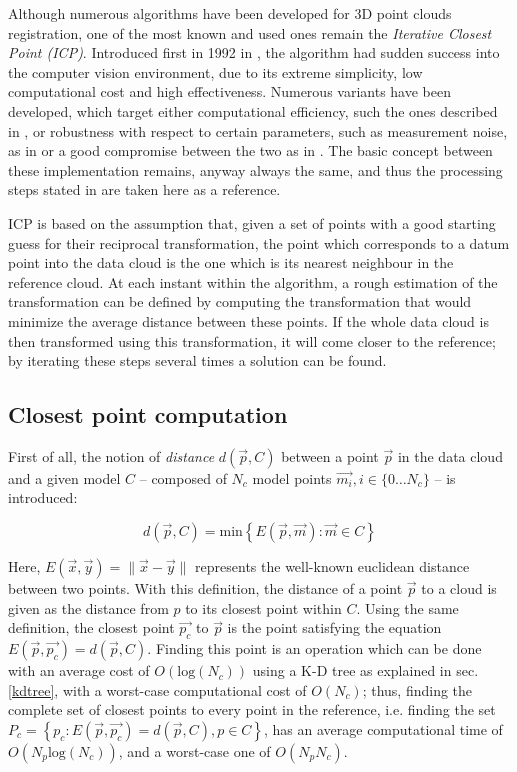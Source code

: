 Although numerous algorithms have been developed for 3D point clouds
registration, one of the most known and used ones remain the
\emph{Iterative Closest Point (\emph{ICP})}. Introduced first in 1992 in
\cite{icp}, the algorithm had sudden success into the computer vision
environment, due to its extreme simplicity, low computational cost and high
effectiveness. Numerous variants have been developed, which target either
computational efficiency, such the ones described in
\cite{icp-fast-algorithms}, or robustness with respect to certain parameters,
such as measurement noise, as in \cite{icp-bayes} or a good compromise between the
two as in \cite{icp-robust}. The basic concept between these implementation
remains, anyway always the same, and thus the processing steps stated in
\cite{icp} are taken here as a reference.

ICP is based on the assumption that, given a set of points with a good starting
guess for their reciprocal transformation, the point which corresponds to a
datum point into the data cloud is the one which is its
nearest neighbour in the reference cloud. At each instant within the
algorithm, a rough estimation of the transformation can be defined by computing
the transformation that would minimize the average distance between these
points. If the whole data cloud is then transformed using this transformation,
it will come closer to the reference; by iterating these steps several times a
solution can be found.

\subsection{Closest point computation}
First of all, the notion of \emph{distance} $d(\vec{p},C)$ between a point $\vec{p}$ in the data cloud
and a given model $C$ -- composed of $N_c$ model points $\vec{m_i}, i \in \{0 \dots
N_c\}$  -- is introduced:

\begin{equation}
d(\vec{p},C) = \text{min}\left\{ E(\vec{p}, \vec{m}) : \vec{m} \in C \right\}
\end{equation}

Here, $E(\vec{x},\vec{y})=\lVert \vec{x} - \vec{y} \rVert$ represents the well-known
euclidean distance between two points. With this definition, the distance of a
point $\vec{p}$ to a cloud is given as the distance from $p$ to its closest
point within $C$. Using the same definition, the closest point $\vec{p_c}$ to
$\vec{p}$ is the point satisfying the equation $E(\vec{p},
\vec{p_c})=d(\vec{p}, C)$. Finding this point is an operation which can be done
with an average cost of $O\left(\text{log}\left(N_c\right)\right)$ using a K-D
tree as explained in sec. \ref{kdtree}, with a worst-case computational cost of
$O\left( N_c \right)$; thus, finding the complete set of closest points to
every point in the reference, i.e. finding the set $P_{c} = \left\{ p_c :
E(\vec{p},\vec{p_c}) = d(\vec{p},C) , p \in C \right\}$, has an average
computational time of $O\left( N_p \text{log}\left(N_c\right) \right)$, and a
worst-case one of $O\left( N_p N_c \right)$.

